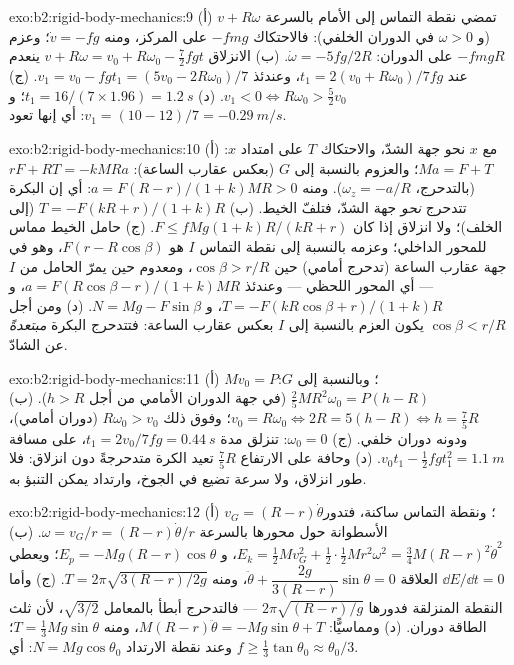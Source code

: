 \begin{solution}{exo:b2:rigid-body-mechanics:9}
(أ) تمضي نقطة التماس إلى الأمام بالسرعة $v + R\omega$ (و $\omega > 0$ في
الدوران الخلفي): فالاحتكاك $-fmg$ على المركز، ومنه $\dot v = -fg$؛ وعزم
$-fmgR$ على الدوران: $\dot\omega = -5fg/2R$. (ب) الانزلاق $v + R\omega = v_0 +
R\omega_0 - \tfrac72fgt$ ينعدم عند $t_1 = 2(v_0 + R\omega_0)/7fg$، وعندئذ $v_1
= v_0 - fgt_1 = (5v_0 - 2R\omega_0)/7$. (ج) $v_1 < 0 \iff R\omega_0 > \tfrac52v_0$.
(د) $t_1 = 16/(7 \times 1.96) = \qty{1.2}{s}$؛ و $v_1 = (10 - 12)/7 = \qty{-0.29}{m/s}$:
أي إنها تعود.
\end{solution}

\begin{solution}{exo:b2:rigid-body-mechanics:10}
(أ) مع $x$ نحو جهة الشدّ، والاحتكاك $T$ على امتداد $x$: $Ma = F + T$؛
والعزوم بالنسبة إلى $G$ (بعكس عقارب الساعة): $rF + RT = -kMRa$ (بالتدحرج، $\omega_z
= -a/R$). ومنه $a = F(R - r)/(1 + k)MR > 0$: أي إن البكرة تتدحرج
\emph{نحو} جهة الشدّ، فتلفّ الخيط. (ب) $T = -F(kR + r)/(1 +
k)R$ (إلى الخلف)؛ ولا انزلاق إذا كان $F \le fMg(1 + k)R/(kR + r)$. (ج) حامل
الخيط مماس للمحور الداخلي؛ وعزمه بالنسبة إلى نقطة
التماس $I$ هو $F(r - R\cos\beta)$، وهو في جهة عقارب الساعة (تدحرج أمامي) حين $\cos\beta >
r/R$، ومعدوم حين يمرّ الحامل من $I$ --- أي المحور اللحظي ---
وعندئذ $a = F(R\cos\beta - r)/(1 + k)MR$، و $T = -F(kR\cos\beta + r)/(1 + k)R$،
و $N = Mg - F\sin\beta$. (د) ومن أجل $\cos\beta < r/R$ يكون العزم بالنسبة إلى $I$
بعكس عقارب الساعة: فتتدحرج البكرة \emph{مبتعدةً} عن الشادّ.
\end{solution}

\begin{solution}{exo:b2:rigid-body-mechanics:11}
(أ) $Mv_0 = P$؛ وبالنسبة إلى $G$: $\tfrac25MR^2\omega_0 = P(h - R)$ (في جهة الدوران الأمامي
من أجل $h > R$). (ب) $v_0 = R\omega_0 \iff 2R = 5(h - R) \iff h = \tfrac75R$؛ وفوق
ذلك $R\omega_0 > v_0$ (دوران أمامي)، ودونه دوران خلفي. (ج)
$\omega_0 = 0$: تنزلق مدة $t_1 = 2v_0/7fg = \qty{0.44}{s}$، على مسافة $v_0t_1 -
\tfrac12fgt_1^2 = \qty{1.1}{m}$. (د) وحافة على الارتفاع $\tfrac75R$ تعيد الكرة
متدحرجةً دون انزلاق: فلا طور انزلاق، ولا سرعة تضيع في الجوخ،
وارتداد يمكن التنبؤ به.
\end{solution}

\begin{solution}{exo:b2:rigid-body-mechanics:12}
(أ) $v_G = (R - r)\dot\theta$؛ ونقطة التماس ساكنة، فتدور
الأسطوانة حول محورها بالسرعة $\omega = v_G/r = (R - r)\dot\theta/r$.
(ب) $E_k = \tfrac12Mv_G^2 + \tfrac12\cdot\tfrac12Mr^2\omega^2 = \tfrac34M(R - r)^2
\dot\theta^2$، و $E_p = -Mg(R - r)\cos\theta$؛ ويعطي $\dd E/\dd t = 0$ العلاقة $\ddot\theta
+ \dfrac{2g}{3(R - r)}\sin\theta = 0$، ومنه $T = 2\pi\sqrt{3(R - r)/2g}$. (ج) وأما
النقطة المنزلقة فدورها $2\pi\sqrt{(R - r)/g}$ --- فالتدحرج أبطأ بالمعامل $\sqrt{3/2}$،
لأن ثلث الطاقة دوران. (د) ومماسيًّا: $M(R - r)\ddot\theta =
-Mg\sin\theta + T$، ومنه $T = \tfrac13Mg\sin\theta$؛ وعند نقطة الارتداد
$N = Mg\cos\theta_0$: أي $f \ge \tfrac13\tan\theta_0 \approx \theta_0/3$.
\end{solution}

